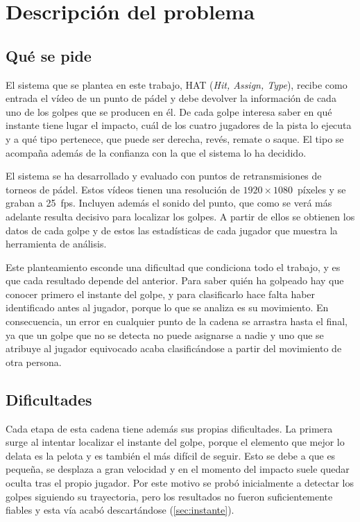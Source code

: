 \section{Descripción del problema}
\label{sec:problema}

\subsection{Qué se pide}
\label{sec:que-se-pide}

El sistema que se plantea en este trabajo, HAT (\textit{Hit, Assign, Type}), recibe como entrada el vídeo de un punto de pádel y debe devolver la información de cada uno de los golpes que se producen en él.
De cada golpe interesa saber en qué instante tiene lugar el impacto, cuál de los cuatro jugadores de la pista lo ejecuta y a qué tipo pertenece, que puede ser derecha, revés, remate o saque.
El tipo se acompaña además de la confianza con la que el sistema lo ha decidido.

El sistema se ha desarrollado y evaluado con puntos de retransmisiones de torneos de pádel.
Estos vídeos tienen una resolución de $1920 \times 1080$~píxeles y se graban a 25~\ac{fps}.
Incluyen además el sonido del punto, que como se verá más adelante resulta decisivo para localizar los golpes.
A partir de ellos se obtienen los datos de cada golpe y de estos las estadísticas de cada jugador que muestra la herramienta de análisis.

Este planteamiento esconde una dificultad que condiciona todo el trabajo, y es que cada resultado depende del anterior.
Para saber quién ha golpeado hay que conocer primero el instante del golpe, y para clasificarlo hace falta haber identificado antes al jugador, porque lo que se analiza es su movimiento.
En consecuencia, un error en cualquier punto de la cadena se arrastra hasta el final, ya que un golpe que no se detecta no puede asignarse a nadie y uno que se atribuye al jugador equivocado acaba clasificándose a partir del movimiento de otra persona.

\subsection{Dificultades}
\label{sec:dificultades}

Cada etapa de esta cadena tiene además sus propias dificultades.
La primera surge al intentar localizar el instante del golpe, porque el elemento que mejor lo delata es la pelota y es también el más difícil de seguir.
Esto se debe a que es pequeña, se desplaza a gran velocidad y en el momento del impacto suele quedar oculta tras el propio jugador.
Por este motivo se probó inicialmente a detectar los golpes siguiendo su trayectoria, pero los resultados no fueron suficientemente fiables y esta vía acabó descartándose (\cref{sec:instante}).

